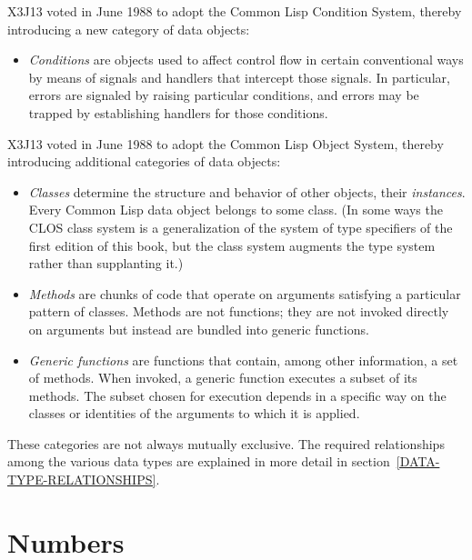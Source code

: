 \begin{new}
X3J13 voted in June 1988
to adopt the Common Lisp Condition System,
thereby introducing a new category of data objects:

\begin{itemize}
\item
\emph{Conditions} are objects used to affect control flow in certain
conventional ways by means of signals and handlers that intercept those signals.
In particular, errors are signaled by raising particular conditions,
and errors may be trapped by establishing handlers for those conditions.
\end{itemize}
\end{new}

\begin{new}
X3J13 voted in June 1988
to adopt the Common Lisp Object System,
thereby introducing additional categories of data objects:

\begin{itemize}
\item
\emph{Classes} determine the structure and behavior of other
objects, their \emph{instances}.  Every Common Lisp data object
belongs to some class.  (In some ways the CLOS class system is
a generalization of the system of type specifiers of the first edition of this book,
but the class system augments the type system rather than supplanting it.)

\item
\emph{Methods} are chunks of code that operate on arguments
satisfying a particular pattern of classes.  Methods are
not functions; they are not invoked directly on arguments
but instead are bundled into generic functions.

\item
\emph{Generic functions} are functions that contain, among other
information, a set of methods.  When invoked, a generic function
executes a subset of its methods.  The subset chosen for execution
depends in a specific way on the classes or identities of the arguments
to which it is applied.
\end{itemize}
\end{new}

These categories are not always mutually exclusive.
The required relationships among the various data types are
explained in more detail in section~\ref{DATA-TYPE-RELATIONSHIPS}.

\section{Numbers}

